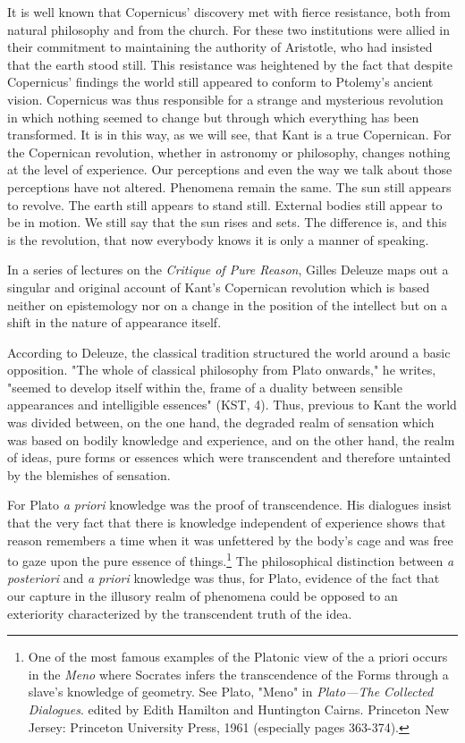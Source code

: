 It is well known that Copernicus' discovery met with fierce resistance, both from natural philosophy and from the church. For these two institutions were allied in their commitment to maintaining the authority of Aristotle, who had insisted that the earth stood still. This resistance was heightened by the fact that despite Copernicus' findings the world still appeared to conform to Ptolemy's ancient vision. Copernicus was thus responsible for a strange and mysterious revolution in which nothing seemed to change but through which everything has been transformed. It is in this way, as we will see, that Kant is a true Copernican. For the Copernican revolution, whether in astronomy or philosophy, changes nothing at the level of experience. Our perceptions and even the way we talk about those perceptions have not altered. Phenomena remain the same. The sun still appears to revolve. The earth still appears to stand still. External bodies still appear to be in motion. We still say that the sun rises and sets. The difference is, and this is the revolution, that now everybody knows it is only a manner of speaking.

In a series of lectures on the \textit{Critique of Pure Reason}, Gilles Deleuze maps out a singular and original account of Kant's Copernican revolution which is based neither on epistemology nor on a change in the position of the intellect but on a shift in the nature of appearance itself. 

According to Deleuze, the classical tradition structured the world around a basic opposition. "The whole of classical philosophy from Plato onwards," he writes, "seemed to develop itself within the, frame of a duality between sensible appearances and intelligible essences" (KST, 4). Thus, previous to Kant the world was divided between, on the one hand, the degraded realm of sensation which was based on bodily knowledge and experience, and on the other hand, the realm of ideas, pure forms or essences which were transcendent and therefore untainted by the blemishes of sensation. 

For Plato \textit{a priori} knowledge was the proof of transcendence. His dialogues insist that the very fact that there is knowledge independent of experience shows that reason remembers a time when it was unfettered by the body's cage and was free to gaze upon the pure essence of things.\footnote{One of the most famous examples of the Platonic view of the a priori occurs in the \textit{Meno} where Socrates infers the transcendence of the Forms through a slave's knowledge of geometry. See Plato, "Meno" in \textit{Plato---The Collected Dialogues}. edited by Edith Hamilton and Huntington Cairns. Princeton New Jersey: Princeton University Press, 1961 (especially pages 363-374).} The philosophical distinction between \textit{a posteriori} and \textit{a priori} knowledge was thus, for Plato, evidence of the fact that our capture in the illusory realm of phenomena could be opposed to an exteriority characterized by the transcendent truth of the idea.

